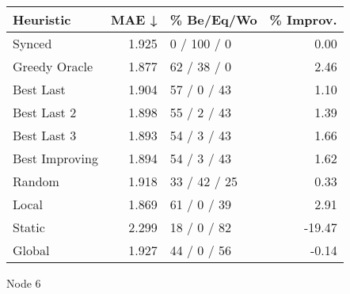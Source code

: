 \begin{tabular}{lrlr}
\toprule
\textbf{Heuristic} & \textbf{MAE ↓} & \textbf{\% Be/Eq/Wo} & \textbf{\% Improv.} \\
\midrule
            Synced &          1.925 &          0 / 100 / 0 &                0.00 \\
     Greedy Oracle &          1.877 &          62 / 38 / 0 &                2.46 \\
         Best Last &          1.904 &          57 / 0 / 43 &                1.10 \\
       Best Last 2 &          1.898 &          55 / 2 / 43 &                1.39 \\
       Best Last 3 &          1.893 &          54 / 3 / 43 &                1.66 \\
    Best Improving &          1.894 &          54 / 3 / 43 &                1.62 \\
            Random &          1.918 &         33 / 42 / 25 &                0.33 \\
             Local &          1.869 &          61 / 0 / 39 &                2.91 \\
            Static &          2.299 &          18 / 0 / 82 &              -19.47 \\
            Global &          1.927 &          44 / 0 / 56 &               -0.14 \\
\bottomrule
\end{tabular}
\caption{Node 6}
\label{tab:ds_non_lr01_le2_bs2_6}
